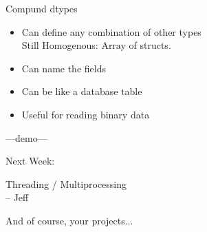 \documentclass{beamer}
\begin{document}
\begin{frame}[fragile]{Compund dtypes}

\begin{itemize}
  \item Can define any combination of other types \\
        Still Homogenous:  Array of structs.
  \item Can name the fields
  \item Can be like a database table
  \item Useful for reading binary data
\end{itemize}

\vfill
{\Large ---demo---}

\end{frame} 













\begin{frame}[fragile]{Next Week:}

\vfill
{\LARGE Threading / Multiprocessing}\\[0.2in]
{\Large  \hspace{0.5in} -- Jeff}


\vfill
{\Large And of course, your projects...}

\vfill

\end{frame}
\end{document}
